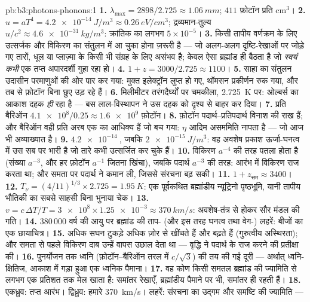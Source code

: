 \begin{solution}{pb:b3:photons-phonons:1}
\textbf{1.} $\lambda_{\max} = 2898/2.725 \approx \qty{1.06}{mm}$;
$411$ फ़ोटॉन प्रति cm$^3$।
\textbf{2.} $u = aT^4 = \qty{4.2e-14}{J/m^3} \approx
\qty{0.26}{eV/cm^3}$; द्रव्यमान-तुल्य $u/c^2 \approx
\qty{4.6e-31}{kg/m^3}$: क्रांतिक का लगभग $5\times10^{-5}$।
\textbf{3.} किसी तापीय वर्णक्रम के लिए उत्सर्जक और विकिरण का
संतुलन में आ चुका होना ज़रूरी है --- जो अलग-अलग दृष्टि-रेखाओं पर
जोड़े गए तारों, धूल या प्लाज़्मा के किसी भी संग्रह के लिए असंभव है;
केवल ऐसा ब्रह्मांड ही बैठता है जो \emph{स्वयं कभी} एक तप्त
अपारदर्शी गुहा रहा हो।
\textbf{4.} $1 + z = 3000/2.725 \approx 1100$।
\textbf{5.} साहा का संतुलन उदासीन परमाणुओं की ओर पार कर गया: मुक्त
इलेक्ट्रॉन लुप्त हो गए, थॉमसन प्रकीर्णन रुक गया, और तब से फ़ोटॉन
बिना छुए उड़ रहे हैं।
\textbf{6.} मिलीमीटर तरंगदैर्घ्यों पर चमकीला, \qty{2.725}{K} पर:
ओल्बर्स का आकाश दहक \emph{ही} रहा है --- बस लाल-विस्थापन ने उस दहक
को दृश्य से बाहर कर दिया।
\textbf{7.} प्रति बैरिऑन $\num{4.1e8}/0.25 \approx \num{1.6e9}$
फ़ोटॉन।
\textbf{8.} फ़ोटॉन पदार्थ--प्रतिपदार्थ विनाश की राख हैं; और
बैरिऑन वही प्रति अरब एक का आधिक्य हैं जो बच गया: $\eta$ आदिम
असममिति नापता है --- जो आज भी अव्याख्यात है।
\textbf{9.} $\qty{4.2e-14}{}$, जबकि $\qty{2e-15}{J/m^3}$: वह
अवशेष प्रकाश ऊर्जा-घनत्व में उस सब पर भारी है जो तारे कभी
उत्सर्जित कर चुके हैं।
\textbf{10.} विकिरण $a^{-4}$ की तरह पतला होता है (संख्या
$a^{-3}$, और हर फ़ोटॉन $a^{-1}$ जितना खिंचा), जबकि पदार्थ
$a^{-3}$ की तरह: आरंभ में विकिरण राज करता था; और समता पर पदार्थ ने
कमान ली, जिससे संरचना बढ़ सकी।
\textbf{11.} $1 + z_{\text{सम}} \approx 3400$।
\textbf{12.} $T_\nu = (4/11)^{1/3} \times 2.725 =
\qty{1.95}{K}$: एक पूर्वकथित ब्रह्मांडीय न्यूट्रिनो पृष्ठभूमि,
यानी तापीय भौतिकी का सबसे साहसी बिना भुनाया चेक।
\textbf{13.} $v = c\,\Delta T/T = \num{3e8} \times \num{1.25e-3}
\approx \qty{370}{km/s}$: अवशेष-तंत्र से होकर सौर मंडल की गति।
\textbf{14.} 380\,000 वर्ष की आयु पर ब्रह्मांड की ताप- (और इस तरह
घनत्व तथा वेग-) लहरें: बीजों का एक छायाचित्र।
\textbf{15.} अधिक सघन टुकड़े अधिक ज़ोर से खींचते हैं और बढ़ते हैं
(गुरुत्वीय अस्थिरता); और समता से पहले विकिरण दाब उन्हें वापस उछाल
देता था --- वृद्धि ने पदार्थ के राज करने की प्रतीक्षा की।
\textbf{16.} पुनर्योजन तक ध्वनि (फ़ोटॉन--बैरिऑन तरल में
$c/\sqrt3$) की तय की गई दूरी --- अर्थात् ध्वनि-क्षितिज, आकाश में
गड़ा हुआ एक ध्वनिक पैमाना।
\textbf{17.} वह कोण किसी समतल ब्रह्मांड की ज्यामिति से लगभग एक
प्रतिशत तक मेल खाता है: समांतर रेखाएँ, ब्रह्मांडीय पैमाने पर भी,
समांतर ही रहती हैं।
\textbf{18.} एकध्रुव: तप्त आरंभ। द्विध्रुव: हमारे
\qty{370}{km/s}। लहरें: संरचना का उद्गम और समष्टि की ज्यामिति ---

\end{solution}
